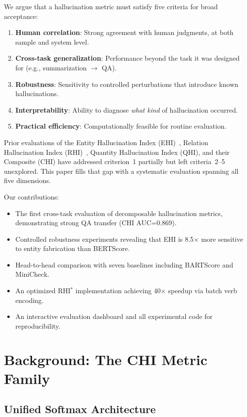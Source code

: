 \documentclass[11pt]{article}
\begin{document}
We argue that a hallucination metric must satisfy five criteria for broad acceptance:
\begin{enumerate}
    \item \textbf{Human correlation}: Strong agreement with human judgments, at both sample and system level.
    \item \textbf{Cross-task generalization}: Performance beyond the task it was designed for (e.g., summarization $\to$ QA).
    \item \textbf{Robustness}: Sensitivity to controlled perturbations that introduce known hallucinations.
    \item \textbf{Interpretability}: Ability to diagnose \emph{what kind} of hallucination occurred.
    \item \textbf{Practical efficiency}: Computationally feasible for routine evaluation.
\end{enumerate}

Prior evaluations of the Entity Hallucination Index (EHI)~\cite{katwe2025ehi}, Relation Hallucination Index (RHI)~\cite{katwe2024rhi}, Quantity Hallucination Index (QHI), and their Composite (CHI) have addressed criterion~1 partially but left criteria~2--5 unexplored. This paper fills that gap with a systematic evaluation spanning all five dimensions.

Our contributions:
\begin{itemize}
    \item The first cross-task evaluation of decomposable hallucination metrics, demonstrating strong QA transfer (CHI AUC=0.869).
    \item Controlled robustness experiments revealing that EHI is 8.5$\times$ more sensitive to entity fabrication than BERTScore.
    \item Head-to-head comparison with seven baselines including BARTScore and MiniCheck.
    \item An optimized RHI$^*$ implementation achieving 40$\times$ speedup via batch verb encoding.
    \item An interactive evaluation dashboard and all experimental code for reproducibility.
\end{itemize}


\section{Background: The CHI Metric Family}

\subsection{Unified Softmax Architecture}
\end{document}
